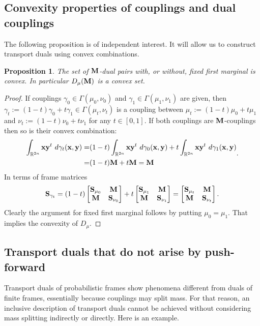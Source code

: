 \documentclass{amsart}
\numberwithin{equation}{section}
\newcommand\bM{{\bf M}}
\newcommand\bS{{\bf S}}
\newcommand\R{{\mathbb R}}
\theoremstyle{plain}
\newtheorem{proposition}[subsection]{Proposition}
\theoremstyle{definition}
\begin{document}
\subsection{ Convexity properties of couplings and dual couplings} The following proposition is of
independent interest. It will allow us to construct transport duals using convex combinations.    
\begin{proposition}\label{convexity_dual}
The set of $\bM$-dual pairs with, or without, fixed first marginal is convex.  In particular $D_{\mu}(\bM)$ is a convex set.  
\end{proposition}
\begin{proof}
If couplings 
$\gamma_0 \in \Gamma(\mu_0,\nu_0)$ and $\gamma_1 \in \Gamma(\mu_1,\nu_1)$ are given, 
then $\gamma_t := (1-t)\gamma_0 +t\gamma_1 \in \Gamma(\mu_t,\nu_t)$
is a coupling between $\mu_t:=(1-t)\mu_0+t\mu_1$ and $\nu_t:=(1-t)\nu_0+t\nu_1$ for any $t \in [0,1]$. 
If both couplings are $\bM$-couplings then so is their convex combination: 
\[ \begin{split}\int_{ \R^{2n} } {\bf x}{\bf y}^t\ d\gamma_t({\bf x},{\bf y})=&(1-t)\int_{ \R^{2n} } {\bf x}{\bf y}^t\ d\gamma_0({\bf x},{\bf y})+t\int_{ \R^{2n} } {\bf x}{\bf y}^t\ d\gamma_1({\bf x},{\bf y})\\ =& (1-t)\bM+t\bM =\bM 
\end{split}.
\]
In terms of frame matrices   
\[   {\bf S}_{\gamma_t}=(1-t)\begin{bmatrix}
\bS_{\mu_0} & \bM \\
 \bM & \bS_{\nu_0}
\end{bmatrix} + 
t \begin{bmatrix}
\bS_{\mu_1} & \bM \\
 \bM & \bS_{\nu_1}
\end{bmatrix}
=\begin{bmatrix}
\bS_{\mu_t} & \bM \\
 \bM & \bS_{\nu_t}
\end{bmatrix}.
\]
Clearly the argument for fixed first marginal follows by putting $\mu_0=\mu_1$. 
That implies the convexity of $D_{\mu}$. 
\end{proof}

\subsection{Transport duals that do not arise by push-forward}  
Transport duals of probabilistic frames show phenomena different from duals of finite frames, essentially because couplings may split mass. 
For that reason, an inclusive description of transport duals cannot be achieved without considering mass splitting indirectly or directly. 
Here is an example.\medskip 
\end{document}
